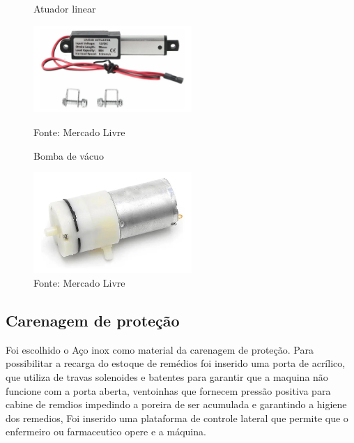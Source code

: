 \documentclass[../poliXuniversity_hospital_(USP)_report.tex]{subfiles}
\begin{document}
\begin{figure}[h]
\centering
    \begin{minipage}{0.5\textwidth}
        \centering
        \caption{Atuador linear}
        \centering %
        \includegraphics[width=6cm]{images/atuador_linear.jpg}
        \caption*{Fonte: Mercado Livre}
        \label{figura: Atuador}
        
    \end{minipage}\hfill
    \begin{minipage}{0.5\textwidth}
    
        \centering
        \caption{Bomba de vácuo}
        \centering %
        \includegraphics[width=6cm]{images/bomba.jpg}
        \caption*{Fonte: Mercado Livre}
        \label{figura: Bomba de Vácuo}
        
    \end{minipage}\hfill
\end{figure}

\subsection{Carenagem de proteção}

Foi escolhido o Aço inox como material da carenagem de proteção. Para possibilitar a recarga do estoque de remédios foi inserido uma porta de acrílico, que utiliza de travas solenoides e batentes para garantir que a maquina não funcione com a porta aberta, ventoinhas que fornecem pressão positiva para cabine de remdios impedindo a poreira de ser acumulada e garantindo a higiene dos remedios, Foi inserido uma plataforma de controle lateral que permite que o enfermeiro ou farmaceutico opere e a máquina.
\end{document}
